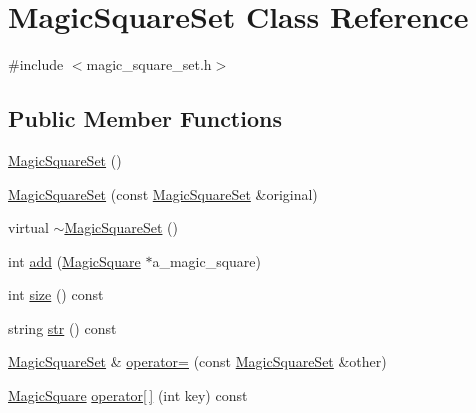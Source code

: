 \hypertarget{classMagicSquareSet}{\section{Magic\-Square\-Set Class Reference}
\label{classMagicSquareSet}
}


{\ttfamily \#include $<$magic\-\_\-square\-\_\-set.\-h$>$}

\subsection*{Public Member Functions}
\begin{DoxyCompactItemize}
\item 
\hyperlink{classMagicSquareSet_a70591cbccd41666cce19f2d720904162}{Magic\-Square\-Set} ()
\item 
\hyperlink{classMagicSquareSet_a6b537e36c455af04096353045a3b2d92}{Magic\-Square\-Set} (const \hyperlink{classMagicSquareSet}{Magic\-Square\-Set} \&original)
\item 
virtual \hyperlink{classMagicSquareSet_adfe49757d5627696c83c3fbf903b7665}{$\sim$\-Magic\-Square\-Set} ()
\item 
int \hyperlink{classMagicSquareSet_af6d417c4a64ad109b86a20cc7499e378}{add} (\hyperlink{classMagicSquare}{Magic\-Square} $\ast$a\-\_\-magic\-\_\-square)
\item 
int \hyperlink{classMagicSquareSet_a7e44d044af79459d650e19fa564c00b5}{size} () const 
\item 
string \hyperlink{classMagicSquareSet_a313f7b06fb202ab327639fedaeda8b03}{str} () const 
\item 
\hyperlink{classMagicSquareSet}{Magic\-Square\-Set} \& \hyperlink{classMagicSquareSet_a219ab922ac0c556c11134a2cbeb2f761}{operator=} (const \hyperlink{classMagicSquareSet}{Magic\-Square\-Set} \&other)
\item 
\hyperlink{classMagicSquare}{Magic\-Square} \hyperlink{classMagicSquareSet_a2ae62f09ce34696ee5bbdb9930b92c85}{operator\mbox{[}$\,$\mbox{]}} (int key) const 
\end{DoxyCompactItemize}


